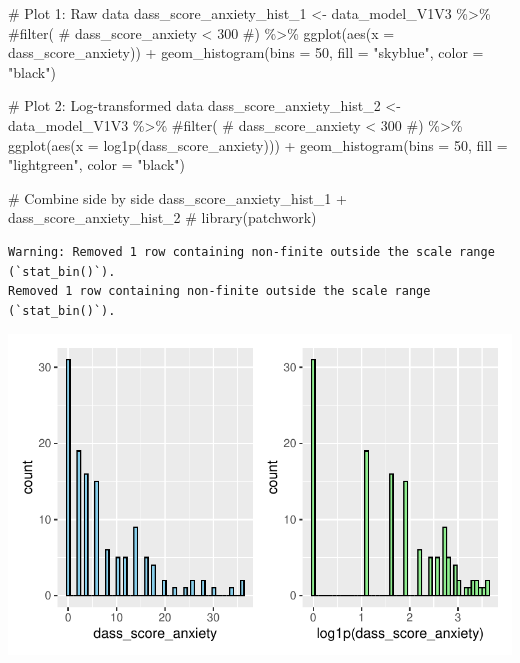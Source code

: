 \documentclass[
  letterpaper,
  DIV=11,
  numbers=noendperiod]{scrartcl}
\newenvironment{Shaded}{\begin{snugshade}}{\end{snugshade}}
\newcommand{\AttributeTok}[1]{\textcolor[rgb]{0.40,0.45,0.13}{#1}}
\newcommand{\CommentTok}[1]{\textcolor[rgb]{0.37,0.37,0.37}{#1}}
\newcommand{\DecValTok}[1]{\textcolor[rgb]{0.68,0.00,0.00}{#1}}
\newcommand{\FunctionTok}[1]{\textcolor[rgb]{0.28,0.35,0.67}{#1}}
\newcommand{\NormalTok}[1]{\textcolor[rgb]{0.00,0.23,0.31}{#1}}
\newcommand{\OtherTok}[1]{\textcolor[rgb]{0.00,0.23,0.31}{#1}}
\newcommand{\SpecialCharTok}[1]{\textcolor[rgb]{0.37,0.37,0.37}{#1}}
\newcommand{\StringTok}[1]{\textcolor[rgb]{0.13,0.47,0.30}{#1}}
\begin{document}
\begin{Shaded}
\begin{Highlighting}[]
\CommentTok{\# Plot 1: Raw data}
\NormalTok{dass\_score\_anxiety\_hist\_1 }\OtherTok{\textless{}{-}}\NormalTok{ data\_model\_V1V3 }\SpecialCharTok{\%\textgreater{}\%} 
    \CommentTok{\#filter(}
    \CommentTok{\#    dass\_score\_anxiety \textless{} 300}
    \CommentTok{\#) \%\textgreater{}\% }
    \FunctionTok{ggplot}\NormalTok{(}\FunctionTok{aes}\NormalTok{(}\AttributeTok{x =}\NormalTok{ dass\_score\_anxiety)) }\SpecialCharTok{+} 
    \FunctionTok{geom\_histogram}\NormalTok{(}\AttributeTok{bins =} \DecValTok{50}\NormalTok{, }\AttributeTok{fill =} \StringTok{"skyblue"}\NormalTok{, }\AttributeTok{color =} \StringTok{"black"}\NormalTok{)}

\CommentTok{\# Plot 2: Log{-}transformed data}
\NormalTok{dass\_score\_anxiety\_hist\_2 }\OtherTok{\textless{}{-}}\NormalTok{ data\_model\_V1V3 }\SpecialCharTok{\%\textgreater{}\%} 
    \CommentTok{\#filter(}
    \CommentTok{\#    dass\_score\_anxiety \textless{} 300}
    \CommentTok{\#) \%\textgreater{}\%}
    \FunctionTok{ggplot}\NormalTok{(}\FunctionTok{aes}\NormalTok{(}\AttributeTok{x =} \FunctionTok{log1p}\NormalTok{(dass\_score\_anxiety))) }\SpecialCharTok{+} 
    \FunctionTok{geom\_histogram}\NormalTok{(}\AttributeTok{bins =} \DecValTok{50}\NormalTok{, }\AttributeTok{fill =} \StringTok{"lightgreen"}\NormalTok{, }\AttributeTok{color =} \StringTok{"black"}\NormalTok{)}

\CommentTok{\# Combine side by side}
\NormalTok{dass\_score\_anxiety\_hist\_1 }\SpecialCharTok{+}\NormalTok{ dass\_score\_anxiety\_hist\_2 }\CommentTok{\# library(patchwork)}
\end{Highlighting}
\end{Shaded}

\begin{verbatim}
Warning: Removed 1 row containing non-finite outside the scale range (`stat_bin()`).
Removed 1 row containing non-finite outside the scale range (`stat_bin()`).
\end{verbatim}

\includegraphics{Outcomes_V1V2V3_files/figure-pdf/dass_score_anxiety_1-1.pdf}
\end{document}
